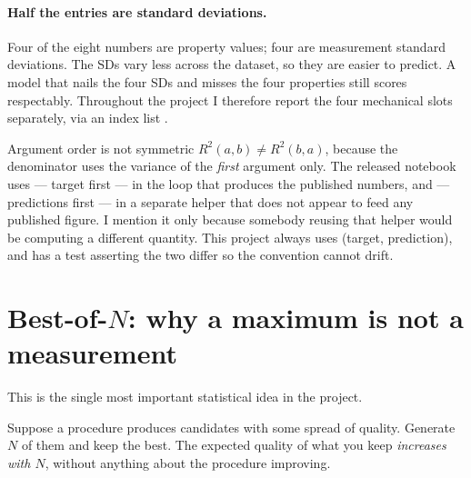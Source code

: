 \paragraph{Half the entries are standard deviations.}
Four of the eight numbers are property values; four are measurement standard
deviations. The SDs vary less across the dataset, so they are easier to predict.
A model that nails the four SDs and misses the four properties still scores
respectably. Throughout the project I therefore report the four mechanical
slots separately, via an index list .

\begin{warnbox}{Argument order is not symmetric}
$R^2(a, b) \neq R^2(b, a)$, because the denominator uses the variance of the
\emph{first} argument only. The released notebook uses  --- target first --- in the loop that produces the published numbers, and
 --- predictions first --- in a separate helper
that does not appear to feed any published figure. I mention it only because
somebody reusing that helper would be computing a different quantity. This
project always uses (target, prediction), and has a test asserting the two
differ so the convention cannot drift.
\end{warnbox}

\section{Best-of-\texorpdfstring{$N$}{N}: why a maximum is not a measurement}
\label{sec:bestofn-concept}

This is the single most important statistical idea in the project.

Suppose a procedure produces candidates with some spread of quality. Generate
$N$ of them and keep the best. The expected quality of what you keep
\emph{increases with $N$}, without anything about the procedure improving.

